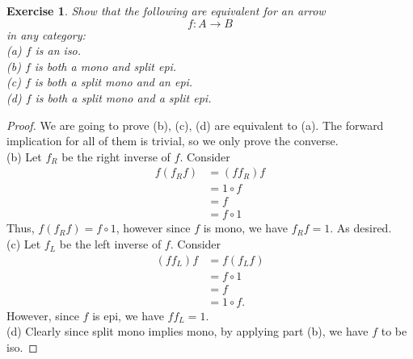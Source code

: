 \documentclass[a4paper, 11pt]{book}
\theoremstyle{plain}
\newtheorem{exercise}{Exercise}[chapter]
\theoremstyle{plain}
\newcommand{\arr}{\rightarrow}
\begin{document}
  \begin{exercise}
    Show that the following are equivalent for an arrow $$f:A \arr B$$ in any category: \\
    (a) $f$ is an iso. \\
    (b) $f$ is both a mono and split epi. \\
    (c) $f$ is both a split mono and an epi. \\
    (d) $f$ is both a split mono and a split epi.
  \end{exercise}

\newpage
  \begin{proof} We are going to prove (b), (c), (d) are equivalent to (a). The forward implication for all of them is trivial, so we only prove the converse. \\

    (b) Let $f_R$ be the right inverse of $f$. Consider 
    \begin{align*}
      f(f_R f) &=(f f_R)f \\
      &= 1 \circ f \\
      &=f \\
      &= f \circ 1
    \end{align*} 
    Thus, $f (f_R f)= f \circ 1$, however since $f$ is mono, we have $f_R f =1$. As desired. \\

    (c) Let $f_L$ be the left inverse of $f$. Consider 
    \begin{align*}
      (f f_L)f &= f (f_L f) \\
      &= f \circ 1 \\
      &= f  \\
      &= 1 \circ f.
    \end{align*}
    However, since $f$ is epi, we have $f f_L=1$. \\

    (d) Clearly since split mono implies mono, by applying part (b), we have $f$ to be iso.
  \end{proof}
\end{document}
